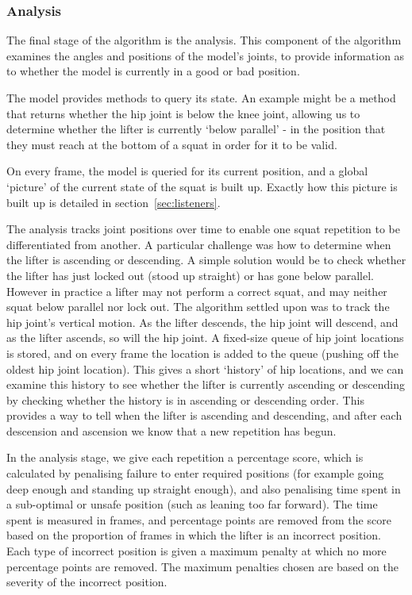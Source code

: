 \subsubsection{Analysis}

The final stage of the algorithm is the analysis. This component of the algorithm examines the angles and positions of the model's joints, to provide information as to whether the model is currently in a good or bad position.

The model provides methods to query its state. An example might be a method that returns whether the hip joint is below the knee joint, allowing us to determine whether the lifter is currently `below parallel' - in the position that they must reach at the bottom of a squat in order for it to be valid. 

On every frame, the model is queried for its current position, and a global `picture' of the current state of the squat is built up. Exactly how this picture is built up is detailed in section~\ref{sec:listeners}.

The analysis tracks joint positions over time to enable one squat repetition to be differentiated from another. A particular challenge was how to determine when the lifter is ascending or descending. A simple solution would be to check whether the lifter has just locked out (stood up straight) or has gone below parallel. However in practice a lifter may not perform a correct squat, and may neither squat below parallel nor lock out. The algorithm settled upon was to track the hip joint's vertical motion. As the lifter descends, the hip joint will descend, and as the lifter ascends, so will the hip joint. A fixed-size queue of hip joint locations is stored, and on every frame the location is added to the queue (pushing off the oldest hip joint location). This gives a short `history' of hip locations, and we can examine this history to see whether the lifter is currently ascending or descending by checking whether the history is in ascending or descending order. This provides a way to tell when the lifter is ascending and descending, and after each descension and ascension we know that a new repetition has begun.

In the analysis stage, we give each repetition a percentage score, which is calculated by penalising failure to enter required positions (for example going deep enough and standing up straight enough), and also penalising time spent in a sub-optimal or unsafe position (such as leaning too far forward). The time spent is measured in frames, and percentage points are removed from the score based on the proportion of frames in which the lifter is an incorrect position. Each type of incorrect position is given a maximum penalty at which no more percentage points are removed. The maximum penalties chosen are based on the severity of the incorrect position.

